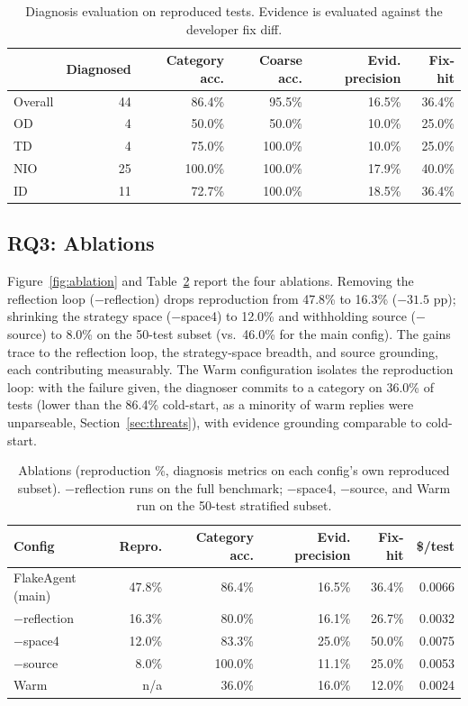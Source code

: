\begin{table}[t]
\caption{Diagnosis evaluation on reproduced tests. Evidence is evaluated
against the developer fix diff.}
\label{tab:diagnosis}
\small
\begin{tabular}{@{}lrrrrr@{}}
\toprule
 & \textbf{Diagnosed} & \textbf{Category acc.} & \textbf{Coarse acc.} &
 \textbf{Evid. precision} & \textbf{Fix-hit}\\
\midrule
Overall & 44 & 86.4\% & 95.5\% & 16.5\% & 36.4\%\\
OD & 4 & 50.0\% & 50.0\% & 10.0\% & 25.0\%\\
TD & 4 & 75.0\% & 100.0\% & 10.0\% & 25.0\%\\
NIO & 25 & 100.0\% & 100.0\% & 17.9\% & 40.0\%\\
ID & 11 & 72.7\% & 100.0\% & 18.5\% & 36.4\%\\
\bottomrule
\end{tabular}
\end{table}

\subsection{RQ3: Ablations}
\label{sec:ablation}

Figure~\ref{fig:ablation} and Table~\ref{tab:ablation} report the four
ablations. Removing the reflection loop ($-$reflection) drops reproduction
from 47.8\% to 16.3\% ($-31.5$ pp); shrinking the strategy space ($-$space4)
to 12.0\% and withholding source ($-$source) to 8.0\% on the 50-test subset
(vs.\ 46.0\% for the main config). The gains trace to the reflection loop,
the strategy-space breadth, and source grounding, each contributing
measurably. The Warm configuration isolates the reproduction loop: with the
failure given, the diagnoser commits to a category on 36.0\% of tests (lower
than the 86.4\% cold-start, as a minority of warm replies were unparseable,
Section~\ref{sec:threats}), with evidence grounding comparable to cold-start.

\begin{table}[t]
\caption{Ablations (reproduction \%, diagnosis metrics on each config's own
reproduced subset). $-$reflection runs on the full benchmark; $-$space4,
$-$source, and Warm run on the 50-test stratified subset.}
\label{tab:ablation}
\small
\begin{tabular}{@{}lrrrrr@{}}
\toprule
\textbf{Config} & \textbf{Repro.} & \textbf{Category acc.} &
\textbf{Evid. precision} & \textbf{Fix-hit} & \textbf{\$/test}\\
\midrule
FlakeAgent (main) & 47.8\% & 86.4\% & 16.5\% & 36.4\% & 0.0066\\
$-$reflection & 16.3\% & 80.0\% & 16.1\% & 26.7\% & 0.0032\\
$-$space4 & 12.0\% & 83.3\% & 25.0\% & 50.0\% & 0.0075\\
$-$source & 8.0\% & 100.0\% & 11.1\% & 25.0\% & 0.0053\\
Warm & n/a & 36.0\% & 16.0\% & 12.0\% & 0.0024\\
\bottomrule
\end{tabular}
\end{table}

